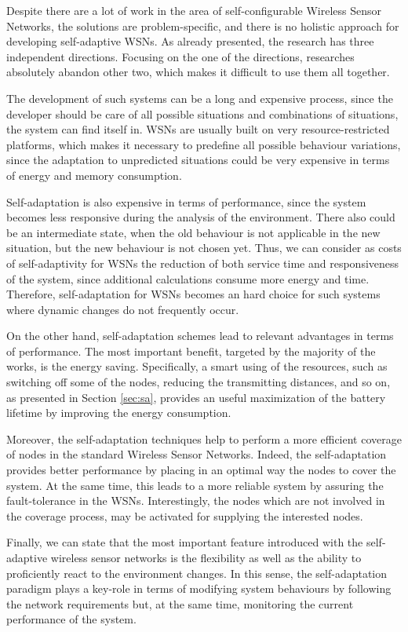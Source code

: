 
Despite there are a lot of work in the area of self-configurable Wireless Sensor
Networks, the solutions are problem-specific, and there is no holistic approach
for developing self-adaptive WSNs. As already presented, the research has three
independent directions. Focusing on the one of the directions, researches
absolutely abandon other two, which makes it difficult to use them all together.

The development of such systems can be a long and expensive process, since the
developer should be care of all possible situations and combinations of
situations, the system can find itself in. WSNs are usually built on very
resource-restricted platforms, which makes it necessary to predefine all
possible behaviour variations, since the adaptation to unpredicted situations
could be very expensive in terms of energy and memory consumption.

Self-adaptation is also expensive in terms of performance, since the system
becomes less responsive during the analysis of the environment. There also could
be an intermediate state, when the old behaviour is not applicable in the new
situation, but the new behaviour is not chosen yet. Thus, we can consider as
costs of self-adaptivity for WSNs the reduction of both service time and
responsiveness of the system, since additional calculations consume more energy
and time. Therefore, self-adaptation for WSNs becomes an hard choice for such
systems where dynamic changes do not frequently occur. 

On the other hand, self-adaptation schemes lead to relevant advantages in terms
of performance. The most important benefit, targeted by the majority of the
works, is the energy saving. Specifically, a smart using of the resources, such
as switching off some of the nodes, reducing the transmitting distances, and so
on, as presented in Section \ref{sec:sa}, provides an useful maximization of the
battery lifetime by improving the energy consumption. 

Moreover, the self-adaptation techniques help to perform a more efficient
coverage of nodes in the standard Wireless Sensor Networks. Indeed, the
self-adaptation provides better performance by placing in an optimal way the
nodes to cover the system. At the same time, this leads to a more reliable
system by assuring the fault-tolerance in the WSNs. Interestingly, the nodes
which are not involved in the coverage process, may be activated for supplying
the interested nodes.

Finally, we can state that the most important feature introduced with the
self-adaptive wireless sensor networks is the flexibility as well as the ability
to proficiently react to the environment changes. In this sense, the
self-adaptation paradigm plays a key-role in terms of modifying system
behaviours by following the  network requirements but, at the same time,
monitoring the current performance of the system.
